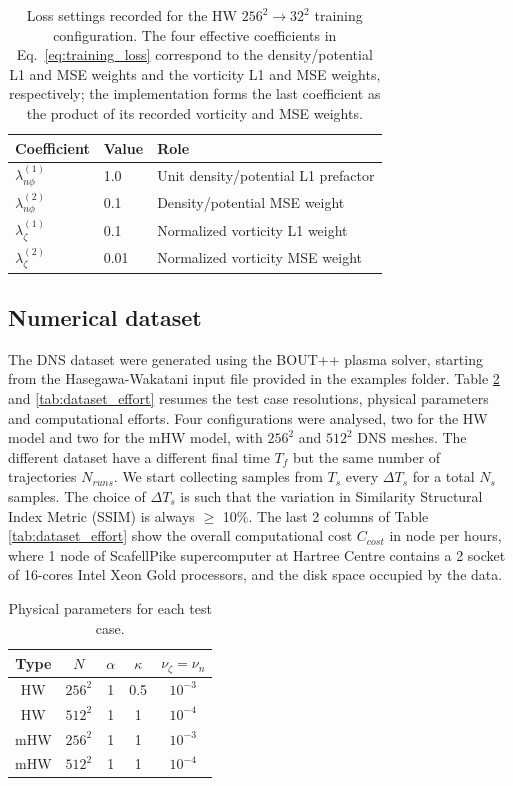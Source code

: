 \documentclass[authoryear,preprint,review,12pt]{elsarticle}
\begin{document}
\begin{table}[ht]
\centering
\caption{Loss settings recorded for the HW $256^2\rightarrow32^2$ training configuration. The four effective coefficients in Eq.~\eqref{eq:training_loss} correspond to the density/potential L1 and MSE weights and the vorticity L1 and MSE weights, respectively; the implementation forms the last coefficient as the product of its recorded vorticity and MSE weights.}
\label{tab:training_loss_weights}
\begin{tabular}{lll}
\toprule
Coefficient & Value & Role \\
\midrule
$\lambda_{n\phi}^{(1)}$ & 1.0 & Unit density/potential L1 prefactor \\
$\lambda_{n\phi}^{(2)}$ & 0.1 & Density/potential MSE weight \\
$\lambda_\zeta^{(1)}$ & 0.1 & Normalized vorticity L1 weight \\
$\lambda_\zeta^{(2)}$ & 0.01 & Normalized vorticity MSE weight \\
\bottomrule
\end{tabular}
\end{table}

\subsection{Numerical dataset}\label{sec:Dataset}

The DNS dataset were generated using the BOUT++ plasma solver, starting from the
Hasegawa-Wakatani input file provided in the examples folder. Table \ref{tab:cases}
and \ref{tab:dataset_effort} resumes the test case resolutions, physical parameters
and computational efforts. Four configurations were analysed, two for the HW model and two for the mHW model, with $256^2$ and $512^2$ DNS meshes. The different dataset have a different final time $T_f$ but the same number of trajectories $N_{runs}$. We start collecting samples from $T_s$ every $\Delta T_s$ for a total $N_s$ samples. The choice of $\Delta T_s$ is such that the variation in Similarity Structural Index Metric (SSIM) is always $\geq$ 10\%. The last 2 columns of Table \ref{tab:dataset_effort} show the overall computational cost $C_{cost}$ in node per hours, where 1 node of ScafellPike supercomputer at Hartree Centre contains a 2 socket of 16-cores Intel Xeon Gold processors, and the disk space occupied by the data.

\begin{table}[htbp]
\centering
\caption{Physical parameters for each test case.}
\label{tab:cases}
\begin{tabular}{|c|c|c|c|c|}
\hline
Type & $N$ & $\alpha$ & $\kappa$ & $\nu_\zeta=\nu_n$ \\
\hline
HW  & $256^2$ & 1 & 0.5 & $10^{-3}$ \\
HW  & $512^2$ & 1 & 1   & $10^{-4}$ \\
mHW & $256^2$ & 1 & 1   & $10^{-3}$ \\
mHW & $512^2$ & 1 & 1   & $10^{-4}$ \\
\hline
\end{tabular}
\end{table}
\end{document}
